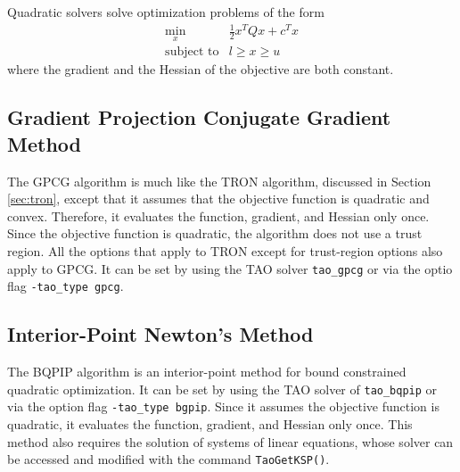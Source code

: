 Quadratic solvers solve optimization problems of the form
\[
\begin{array}{ll}
\displaystyle \min_{x} & \frac{1}{2}x^T Q x + c^T x \\
\mbox{subject to} & l \geq x \geq u
\end{array}
\]
where the gradient and the Hessian of the objective are both constant.

\subsection{Gradient Projection Conjugate Gradient Method}
The GPCG \cite{more-toraldo} algorithm is much like the TRON algorithm, discussed in
Section \ref{sec:tron}, except that
it assumes that the objective function is quadratic and convex.
Therefore, it evaluates the function, gradient, and Hessian only
once.
Since the objective function
is quadratic, the algorithm does not use a trust region.  
All the options that apply to TRON except for trust-region
options also apply to GPCG. It can be set by using the TAO solver 
{\tt tao\_gpcg} or via the optio flag {\tt -tao\_type gpcg}.

\subsection{Interior-Point Newton's Method}\label{sec:bqpip}
The BQPIP algorithm is an interior-point method for bound
constrained quadratic optimization.  It can be set by using the
TAO solver of {\tt tao\_bqpip} or via the option flag {\tt -tao\_type bgpip}.
Since it assumes the objective function is quadratic, 
it evaluates the function, gradient, and Hessian only once.
This method also requires the solution of systems of linear equations,
whose solver can be accessed and modified 
with the command {\tt Tao\-Get\-KSP()}.
